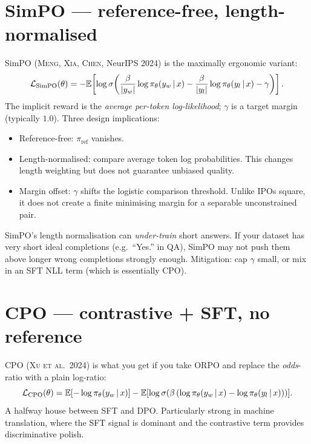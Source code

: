 \documentclass[11pt,oneside]{scrbook}
\begin{document}
\section{SimPO --- reference-free, length-normalised}

SimPO (\textsc{Meng, Xia, Chen}, NeurIPS 2024) is the maximally
ergonomic variant:
\begin{equation}
\mathcal{L}_{\text{SimPO}}(\theta) =
  -\mathbb{E}\!\left[\log\sigma\!\left(\frac{\beta}{|y_w|}\log\pi_\theta(y_w \,\vert\, x)
                                  - \frac{\beta}{|y_l|}\log\pi_\theta(y_l \,\vert\, x)
                                  - \gamma\right)\right].
\label{eq:simpo}
\end{equation}
The implicit reward is the \emph{average per-token log-likelihood};
$\gamma$ is a target margin (typically $1.0$). Three design
implications:
\begin{itemize}[leftmargin=*]
  \item Reference-free: $\pi_{\text{ref}}$ vanishes.
  \item Length-normalised: compare average token log probabilities.
        This changes length weighting but does not guarantee unbiased quality.
  \item Margin offset: $\gamma$ shifts the logistic comparison threshold.
        Unlike IPO\textquotesingle s square, it does not create a finite
        minimising margin for a separable unconstrained pair.

\end{itemize}

\begin{pitfall}
SimPO's length normalisation can \emph{under-train} short answers.
If your dataset has very short ideal completions (e.g.\ ``Yes.''
in QA), SimPO may not push them above longer wrong completions
strongly enough. Mitigation: cap $\gamma$ small, or mix in an SFT
NLL term (which is essentially CPO).
\end{pitfall}

\section{CPO --- contrastive + SFT, no reference}

CPO (\textsc{Xu et al.\ 2024}) is what you get if you take ORPO and
replace the \emph{odds}-ratio with a plain log-ratio:
\begin{equation}
\mathcal{L}_{\text{CPO}}(\theta) =
  \mathbb{E}[-\log\pi_\theta(y_w \,\vert\, x)]
  - \mathbb{E}[\log\sigma(\beta\,(\log\pi_\theta(y_w \,\vert\, x) - \log\pi_\theta(y_l \,\vert\, x)))].
\label{eq:cpo}
\end{equation}
A halfway house between SFT and DPO. Particularly strong in machine
translation, where the SFT signal is dominant and the contrastive
term provides discriminative polish.
\end{document}
